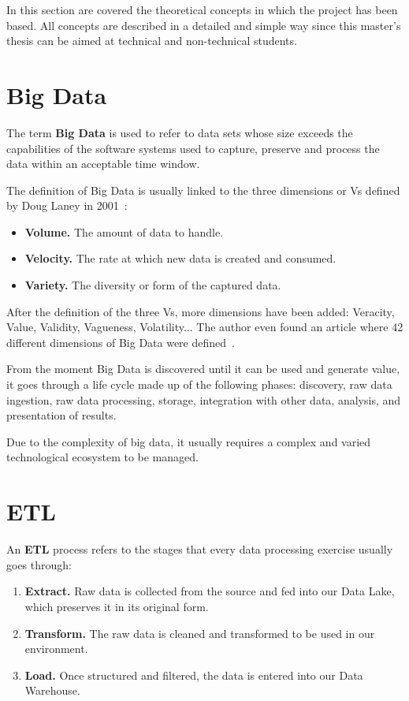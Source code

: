 
\nonzeroparskip In this section are covered the theoretical concepts in which the project has been based. All concepts are described in a detailed and simple way since this master's thesis can be aimed at technical and non-technical students.

\section{Big Data}

\nonzeroparskip The term \textbf{Big Data} is used to refer to data sets whose size exceeds the capabilities of the software systems used to capture, preserve and process the data within an acceptable time window.

\nonzeroparskip The definition of Big Data is usually linked to the three dimensions or Vs defined by Doug Laney in 2001~\cite{bigdata_vs}:
\begin{itemize}
	\item \textbf{Volume.} The amount of data to handle.
	\item \textbf{Velocity.} The rate at which new data is created and consumed.
	\item \textbf{Variety.} The diversity or form of the captured data.
\end{itemize}

\nonzeroparskip After the definition of the three Vs, more dimensions have been added: Veracity, Value, Validity, Vagueness, Volatility... The author even found an article where 42 different dimensions of Big Data were defined~\cite{bigdata_vs}.

\nonzeroparskip From the moment Big Data is discovered until it can be used and generate value, it goes through a life cycle made up of the following phases: discovery, raw data ingestion, raw data processing, storage, integration with other data, analysis, and presentation of results.

\nonzeroparskip Due to the complexity of big data, it usually requires a complex and varied technological ecosystem to be managed.

\section{ETL}
\nonzeroparskip An \textbf{ETL} process refers to the stages that every data processing exercise usually goes through:
\begin{enumerate}
	\item \textbf{Extract.} Raw data is collected from the source and fed into our Data Lake, which preserves it in its original form.
	\item \textbf{Transform.} The raw data is cleaned and transformed to be used in our environment.
	\item \textbf{Load.} Once structured and filtered, the data is entered into our Data Warehouse.
\end{enumerate}

